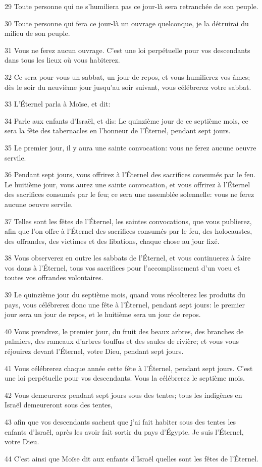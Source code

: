 \par 29 Toute personne qui ne s'humiliera pas ce jour-là sera retranchée de son peuple.
\par 30 Toute personne qui fera ce jour-là un ouvrage quelconque, je la détruirai du milieu de son peuple.
\par 31 Vous ne ferez aucun ouvrage. C'est une loi perpétuelle pour vos descendants dans tous les lieux où vous habiterez.
\par 32 Ce sera pour vous un sabbat, un jour de repos, et vous humilierez vos âmes; dès le soir du neuvième jour jusqu'au soir suivant, vous célébrerez votre sabbat.
\par 33 L'Éternel parla à Moïse, et dit:
\par 34 Parle aux enfants d'Israël, et dis: Le quinzième jour de ce septième mois, ce sera la fête des tabernacles en l'honneur de l'Éternel, pendant sept jours.
\par 35 Le premier jour, il y aura une sainte convocation: vous ne ferez aucune oeuvre servile.
\par 36 Pendant sept jours, vous offrirez à l'Éternel des sacrifices consumés par le feu. Le huitième jour, vous aurez une sainte convocation, et vous offrirez à l'Éternel des sacrifices consumés par le feu; ce sera une assemblée solennelle: vous ne ferez aucune oeuvre servile.
\par 37 Telles sont les fêtes de l'Éternel, les saintes convocations, que vous publierez, afin que l'on offre à l'Éternel des sacrifices consumés par le feu, des holocaustes, des offrandes, des victimes et des libations, chaque chose au jour fixé.
\par 38 Vous observerez en outre les sabbats de l'Éternel, et vous continuerez à faire vos dons à l'Éternel, tous vos sacrifices pour l'accomplissement d'un voeu et toutes vos offrandes volontaires.
\par 39 Le quinzième jour du septième mois, quand vous récolterez les produits du pays, vous célébrerez donc une fête à l'Éternel, pendant sept jours: le premier jour sera un jour de repos, et le huitième sera un jour de repos.
\par 40 Vous prendrez, le premier jour, du fruit des beaux arbres, des branches de palmiers, des rameaux d'arbres touffus et des saules de rivière; et vous vous réjouirez devant l'Éternel, votre Dieu, pendant sept jours.
\par 41 Vous célébrerez chaque année cette fête à l'Éternel, pendant sept jours. C'est une loi perpétuelle pour vos descendants. Vous la célébrerez le septième mois.
\par 42 Vous demeurerez pendant sept jours sous des tentes; tous les indigènes en Israël demeureront sous des tentes,
\par 43 afin que vos descendants sachent que j'ai fait habiter sous des tentes les enfants d'Israël, après les avoir fait sortir du pays d'Égypte. Je suis l'Éternel, votre Dieu.
\par 44 C'est ainsi que Moïse dit aux enfants d'Israël quelles sont les fêtes de l'Éternel.

